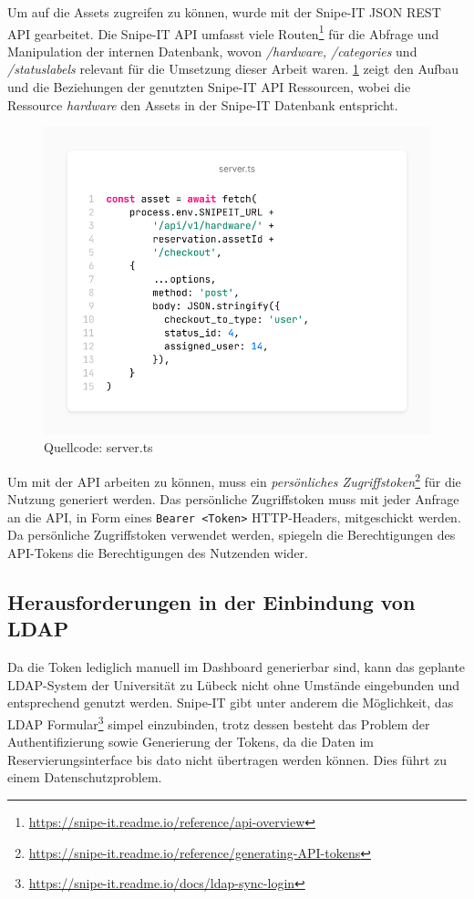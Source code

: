 Um auf die Assets zugreifen zu können, wurde mit der Snipe-IT JSON REST API gearbeitet. Die Snipe-IT
API umfasst viele Routen\footnote{\url{https://snipe-it.readme.io/reference/api-overview}} für die
Abfrage und Manipulation der internen Datenbank, wovon \textit{/hardware, /categories} und
\textit{/statuslabels} relevant für die Umsetzung dieser Arbeit waren. \ref{fig:snipe} zeigt den
Aufbau und die Beziehungen der genutzten Snipe-IT API Ressourcen, wobei die Ressource
\textit{hardware} den Assets in der Snipe-IT Datenbank entspricht.

\begin{figure}[h]
  \centering
  \includegraphics[scale=0.4]{Bilder/screenshot(5).png}
  \caption[Quellcode: server.ts]{Quellcode: server.ts}
  \label{fig:snipe}
\end{figure}

Um mit der API arbeiten zu können, muss ein \textit{persönliches
  Zugriffstoken}\footnote{\url{https://snipe-it.readme.io/reference/generating-API-tokens}} für die
  Nutzung generiert werden. Das persönliche Zugriffstoken muss mit jeder Anfrage an die API, in Form
  eines \lstinline{Bearer <Token>} HTTP-Headers, mitgeschickt werden. Da persönliche Zugriffstoken
  verwendet werden, spiegeln die Berechtigungen des API-Tokens die Berechtigungen des Nutzenden
  wider. 

\subsection{Herausforderungen in der Einbindung von LDAP}
Da die Token lediglich manuell im Dashboard generierbar sind, kann das geplante LDAP-System der
  Universität zu Lübeck nicht ohne Umstände eingebunden und entsprechend genutzt werden. Snipe-IT
  gibt unter anderem die Möglichkeit, das LDAP
  Formular\footnote{\url{https://snipe-it.readme.io/docs/ldap-sync-login}} simpel einzubinden, trotz
  dessen besteht das Problem der Authentifizierung sowie Generierung der Tokens, da die Daten im
  Reservierungsinterface bis dato nicht übertragen werden können. Dies führt zu einem
  Datenschutzproblem.


